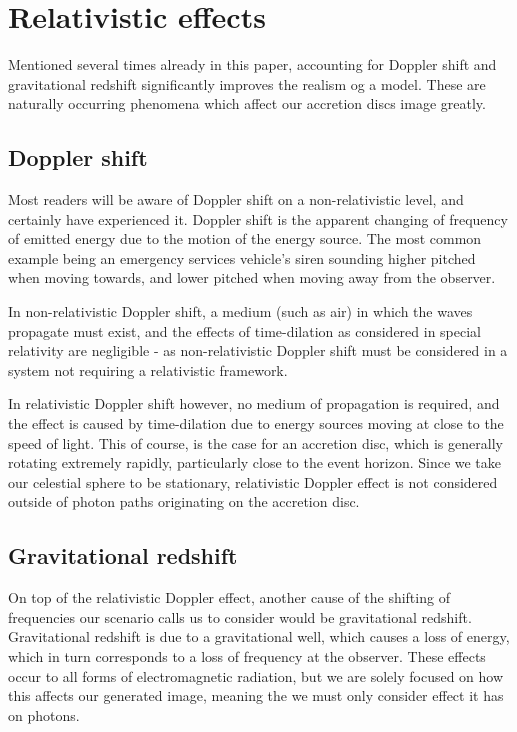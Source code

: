 \documentclass[oneside,openright,frontopenright, singlespacing]{dmathesis}
\begin{document}
\section{Relativistic effects}\label{sec:Section5.2}

	Mentioned several times already in this paper, accounting for Doppler shift and gravitational redshift significantly improves the realism og a model. These are naturally occurring phenomena which affect our accretion discs image greatly.

\subsection{Doppler shift}\label{subsec:Subsection5.2.1}

	Most readers will be aware of Doppler shift on a non-relativistic level, and certainly have experienced it. Doppler shift is the apparent changing of frequency of emitted energy due to the motion of the energy source. The most common example being an emergency services vehicle's siren sounding higher pitched when moving towards, and lower pitched when moving away from the observer.

\vspace{1em}
	In non-relativistic Doppler shift, a medium (such as air) in which the waves propagate must exist, and the effects of time-dilation as considered in special relativity are negligible - as non-relativistic Doppler shift must be considered in a system not requiring a relativistic framework.

\vspace{1em}
	In relativistic Doppler shift however, no medium of propagation is required, and the effect is caused by time-dilation due to energy sources moving at close to the speed of light. This of course, is the case for an accretion disc, which is generally rotating extremely rapidly, particularly close to the event horizon. Since we take our celestial sphere to be stationary, relativistic Doppler effect is not considered outside of photon paths originating on the accretion disc.

\subsection{Gravitational redshift}\label{subsec:Subsection5.2.2}

	On top of the relativistic Doppler effect, another cause of the shifting of frequencies our scenario calls us to consider would be gravitational redshift. Gravitational redshift is due to a gravitational well, which causes a loss of energy, which in turn corresponds to a loss of frequency at the observer. These effects occur to all forms of electromagnetic radiation, but we are solely focused on how this affects our generated image, meaning the we must only consider effect it has on photons.
\end{document}
